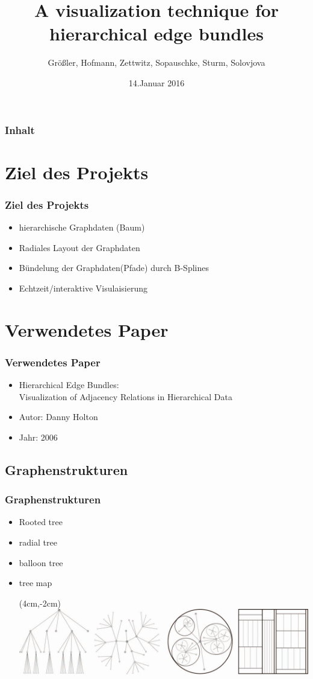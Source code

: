 \documentclass[11pt]{beamer}
\author{Größler, Hofmann, Zettwitz, Sopauschke, Sturm, Solovjova}
\title{A visualization technique for \\  hierarchical edge bundles}
\date{14.Januar 2016}
\begin{document}
\begin{frame}
\titlepage
\end{frame}

\begin{frame}
\frametitle{Inhalt} 
\tableofcontents
\end{frame}


\section{Ziel des Projekts}
\begin{frame}
\frametitle{Ziel des Projekts}
\begin{itemize} 
\item hierarchische Graphdaten (Baum)
\item Radiales Layout der Graphdaten
\item Bündelung der Graphdaten(Pfade) durch B-Splines
\item Echtzeit/interaktive Visulaisierung
\end{itemize}
\end{frame}

\section{Verwendetes Paper}
\begin{frame}[allowframebreaks]
\frametitle{Verwendetes Paper}
\begin{itemize} 
\item Hierarchical Edge Bundles: \\
Visualization of Adjacency Relations in Hierarchical Data
\item Autor: Danny Holton
\item Jahr: 2006
\end{itemize}
\end{frame}

\subsection{Graphenstrukturen}
\begin{frame}
\frametitle{Graphenstrukturen}
\begin{itemize}
\item Rooted tree
\item radial tree
\item balloon tree
\item tree map
\begin{textblock*}{150mm}(4cm,-2cm)
\includegraphics[width=0.5\linewidth]{./TreeTypes.png}
\end{textblock*}
\end{itemize}

\end{frame}
\end{document}
